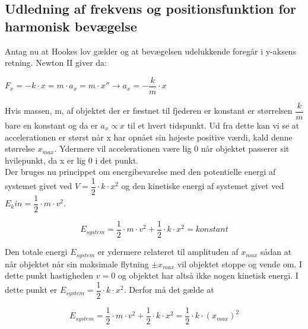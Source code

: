 \subsection{Udledning af frekvens og positionsfunktion for harmonisk bevægelse}
Antag nu at Hookes lov gælder og at bevægelsen udelukkende foregår i y-aksens retning. Newton II giver da: 

\bigskip

\begin{center}
$F_x = -k \cdot x = m \cdot a_x = m \cdot x'' \rightarrow a_x = -\dfrac{k}{m} \cdot x$
\end{center}

\bigskip

Hvis massen, m, af objektet der er fæstnet til fjederen er konstant er størrelsen $\dfrac{k}{m}$ bare en konstant og da er $a_x \propto x$ til et hvert tidspunkt. Ud fra dette kan vi se at accelerationen er størst når x har opnået sin højeste positive værdi, kald denne størrelse $x_{max}$. Ydermere vil accelerationen være lig 0 når objektet passerer sit hvilepunkt, da x er lig 0 i det punkt.
\\

Der bruges nu princippet om energibevarelse med den potentielle energi af systemet givet ved $V=\dfrac{1}{2} \cdot k \cdot x^2$ og den kinetiske energi af systemet givet ved $E_kin = \dfrac{1}{2} \cdot m \cdot v^2$.

\bigskip

\begin{center}
\begin{equation}
E_{system}=\dfrac{1}{2} \cdot m \cdot v^2 + \dfrac{1}{2} \cdot k \cdot x^2 = konstant
\end{equation}
\end{center}

Den totale energi $E_{system}$ er ydermere  relateret til amplituden af $x_{max}$ sådan at når objektet når sin maksimale flytning $\pm x_{max}$ vil objektet stoppe og vende om. I dette punkt hastigheden $v = 0$ og objektet har altså ikke nogen kinetisk energi. I dette punkt er $E_{system } = \dfrac{1}{2} \cdot k \cdot x^2$. Derfor må det gælde at

\bigskip
\begin{center}
\begin{equation}
E_{system}=\dfrac{1}{2} \cdot m \cdot v^2 + \dfrac{1}{2} \cdot k \cdot x^2 = \dfrac{1}{2} \cdot k \cdot (x_{max})^2
\end{equation}
\end{center}
\bigskip

